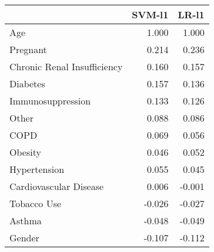 \begin{tabular}{lrr}
\toprule
{} &  SVM-l1 &  LR-l1 \\
\midrule
Age                         &   1.000 &  1.000 \\
Pregnant                    &   0.214 &  0.236 \\
Chronic Renal Insufficiency &   0.160 &  0.157 \\
Diabetes                    &   0.157 &  0.136 \\
Immunosuppression           &   0.133 &  0.126 \\
Other                       &   0.088 &  0.086 \\
COPD                        &   0.069 &  0.056 \\
Obesity                     &   0.046 &  0.052 \\
Hypertension                &   0.055 &  0.045 \\
Cardiovascular Disease      &   0.006 & -0.001 \\
Tobacco Use                 &  -0.026 & -0.027 \\
Asthma                      &  -0.048 & -0.049 \\
Gender                      &  -0.107 & -0.112 \\
\bottomrule
\end{tabular}
